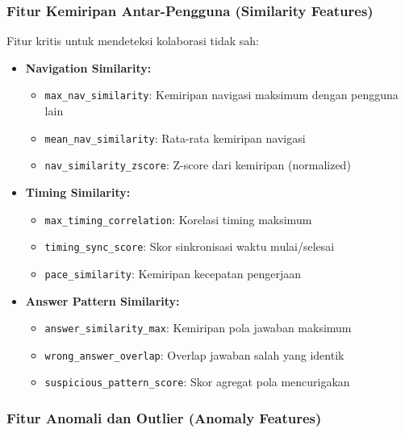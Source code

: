 \subsubsection{Fitur Kemiripan Antar-Pengguna (Similarity Features)}
\label{sec:fiturKemiripan}

Fitur kritis untuk mendeteksi kolaborasi tidak sah:

\begin{itemize}
    \item \textbf{Navigation Similarity:}
    \begin{itemize}
        \item \texttt{max\_nav\_similarity}: Kemiripan navigasi maksimum dengan pengguna lain
        \item \texttt{mean\_nav\_similarity}: Rata-rata kemiripan navigasi
        \item \texttt{nav\_similarity\_zscore}: Z-score dari kemiripan (normalized)
    \end{itemize}
    
    \item \textbf{Timing Similarity:}
    \begin{itemize}
        \item \texttt{max\_timing\_correlation}: Korelasi timing maksimum
        \item \texttt{timing\_sync\_score}: Skor sinkronisasi waktu mulai/selesai
        \item \texttt{pace\_similarity}: Kemiripan kecepatan pengerjaan
    \end{itemize}
    
    \item \textbf{Answer Pattern Similarity:}
    \begin{itemize}
        \item \texttt{answer\_similarity\_max}: Kemiripan pola jawaban maksimum
        \item \texttt{wrong\_answer\_overlap}: Overlap jawaban salah yang identik
        \item \texttt{suspicious\_pattern\_score}: Skor agregat pola mencurigakan
    \end{itemize}
\end{itemize}

\subsubsection{Fitur Anomali dan Outlier (Anomaly Features)}
\label{sec:fiturAnomali}

